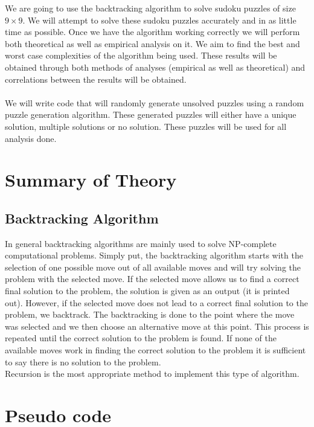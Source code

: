 \documentclass[12pt,a4paper,titlepage]{article}
\begin{document}
We are going to use the backtracking algorithm to solve sudoku puzzles of size $9\times 9$. We will attempt to solve these sudoku puzzles accurately and in as little time as possible. Once we have the algorithm working correctly we will perform both theoretical as well as empirical analysis on it. We aim to find the best and worst case complexities of the algorithm being used. These results will be obtained through both methods of analyses (empirical as well as theoretical) and correlations between the results will be obtained.
\\
\\
We will write code that will randomly generate unsolved puzzles using a random puzzle generation algorithm. These generated puzzles will either have a unique solution, multiple solutions or no solution. These puzzles will be used for all analysis done. 
\\

\section{Summary of Theory}

\subsection{Backtracking Algorithm}

In general backtracking algorithms are mainly used to solve NP-complete computational problems. Simply put, the backtracking algorithm starts with the selection of one possible move out of all available moves and will try solving the problem with the selected move. If the selected move allows us to find a correct final solution to the problem, the solution is given as an output (it is printed out). However, if the selected move does not lead to a correct final solution to the problem, we backtrack. The backtracking is done to the point where the move was selected and we then choose an alternative move at this point. This process is repeated until the correct solution to the problem is found. If none of the available moves work in finding the correct solution to the problem it is sufficient to say there is no solution to the problem.
\\
Recursion is the most appropriate method to implement this type of algorithm.


\section{Pseudo code}
\end{document}
